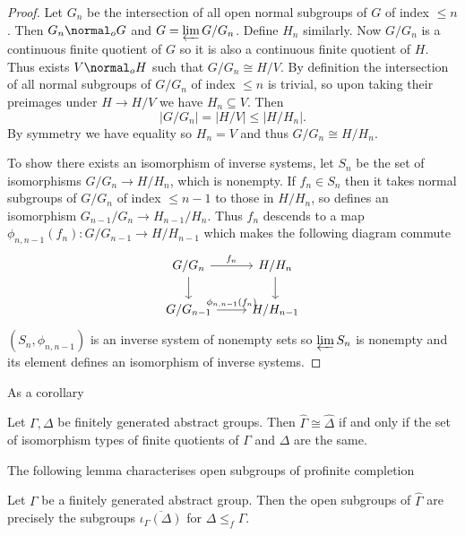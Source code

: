 \documentclass[a4paper]{article}
\begin{document}
\begin{proof}
  Let \(G_n\) be the intersection of all open normal subgroups of \(G\) of index \(\leq n\). Then \(G_n \normal_o G\) and \(G = \varprojlim G/G_n\). Define \(H_n\) similarly. Now \(G/G_n\) is a continuous finite quotient of \(G\) so it is also a continuous finite quotient of \(H\). Thus exists \(V \normal_o H\) such that \(G/G_n \cong H/V\). By definition the intersection of all normal subgroups of \(G/G_n\) of index \(\leq n\) is trivial, so upon taking their preimages under \(H \to H/V\) we have \(H_n \subseteq V\). Then
  \[
    |G/G_n| = |H/V| \leq |H/H_n|.
  \]
  By symmetry we have equality so \(H_n = V\) and thus \(G/G_n \cong H/H_n\).

  To show there exists an isomorphism of inverse systems, let \(S_n\) be the set of isomorphisms \(G/G_n \to H/H_n\), which is nonempty. If \(f_n \in S_n\) then it takes normal subgroups of \(G/G_n\) of index \(\leq n - 1\) to those in \(H/H_n\), so defines an isomorphism \(G_{n - 1}/G_n \to H_{n - 1}/H_n\). Thus \(f_n\) descends to a map \(\phi_{n, n - 1}(f_n): G/G_{n - 1} \to H/H_{n - 1}\) which makes the following diagram commute
  \[
    \begin{tikzcd}
      G/G_n \ar[r, "f_n"] \ar[d] & H/H_n \ar[d] \\
      G/G_{n - 1} \ar[r, "\phi_{n, n - 1}(f_n)"] & H/H_{n - 1}
    \end{tikzcd}
  \]
  \((S_n, \phi_{n, n - 1})\) is an inverse system of nonempty sets so \(\varprojlim S_n\) is nonempty and its element defines an isomorphism of inverse systems.
\end{proof}

As a corollary

\begin{theorem}
  Let \(\Gamma, \Delta\) be finitely generated abstract groups. Then \(\hat \Gamma \cong \hat \Delta\) if and only if the set of isomorphism types of finite quotients of \(\Gamma\) and \(\Delta\) are the same.
\end{theorem}

The following lemma characterises open subgroups of profinite completion


\begin{lemma}
  \label{lem:subgroup correspondence for profinite completion}
  Let \(\Gamma\) be a finitely generated abstract group. Then the open subgroups of \(\hat \Gamma\) are precisely the subgroups \(\overline{\iota_\Gamma(\Delta)}\) for \(\Delta \leq_f \Gamma\).
\end{lemma}
\end{document}

